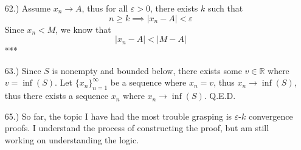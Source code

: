 \documentclass[12pt]{article}
\newcommand{\vertb}[1]{\left\vert#1\right\vert}
\begin{document}
\begin{itemize}















    \item [62.)] Assume $x_n\to A$, thus for all $\varepsilon>0$, there exists $k$ such that
    \[n\geq k\implies\vertb{x_n-A}<\varepsilon\]
    Since $x_n<M$, we know that
    \[\vertb{x_n-A}<\vertb{M-A}\]
    ***

    \item [63.)] Since $S$ is nonempty and bounded below, there exists some $v\in\mathbb{R}$ where $v=\inf(S)$. Let $\{x_n\}^\infty_{n=1}$ be a sequence where $x_n=v$, thus $x_n\to\inf(S)$, thus there exists a sequence $x_n$ where $x_n\to\inf(S)$. Q.E.D.


    \item [65.)] So far, the topic I have had the most trouble grasping is $\varepsilon$-$k$ convergence proofs. I understand the process of constructing the proof, but am still working on understanding the logic.


\end{itemize}
\end{document}
